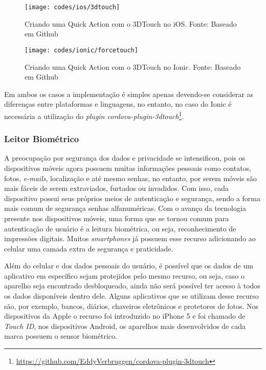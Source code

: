 \begin{figure}[H]
	\centering
	\texttt{[image: codes/ios/3dtouch]}
	\caption[Criando uma Quick Action com o 3DTouch no iOS.]{Criando uma Quick Action com o 3DTouch no iOS. Fonte: Baseado em Github\protect\footnotemark}
	\label{fig:3dtouch-ios}
\end{figure}
\begin{figure}[H]
	\centering
	\texttt{[image: codes/ionic/forcetouch]}
	\caption[Criando uma Quick Action com o 3DTouch no Ionic]{Criando uma Quick Action com o 3DTouch no Ionic. Fonte: Baseado em Github\protect\footnotemark}
	\label{fig:forcetouch-ionic}
\end{figure}

Em ambos os casos a implementação é simples apenas devendo-se considerar as diferenças entre plataformas e linguagens, no entanto, no caso do Ionic é necessária a utilização do 
\textit{plugin cordova-plugin-3dtouch}\footnote{\url{https://github.com/EddyVerbruggen/cordova-plugin-3dtouch}}. 

\subsubsection{Leitor Biométrico} \label{subsubsec:biometrico}
A preocupação por segurança dos dados e privacidade se intensificou, pois os dispositivos móveis agora possuem muitas informações pessoais como contatos, fotos, \textit{e-mails}, localização e até mesmo senhas, no entanto,
por serem móveis são mais fáceis de serem extraviados, furtados ou invadidos. Com isso, cada dispositivo possui seus próprios meios de autenticação e segurança, sendo a forma mais comum de segurança senhas alfanuméricas. 
Com o avanço da tecnologia presente nos dispositivos móveis, uma forma que se tornou comum para autenticação de usuário é a leitura biométrica, ou seja, reconhecimento de impressões digitais. Muitos \textit{smartphones} 
já possuem esse recurso adicionando ao celular uma camada extra de segurança e praticidade. 

Além do celular e dos dados pessoais do usuário, é possível que os dados de um aplicativo em específico sejam protejidos pelo mesmo recurso, ou seja, caso o aparelho seja encontrado desbloqueado, ainda não será possível 
ter acesso à todos os dados disponíveis dentro dele. Alguns aplicativos que se utilizam desse recurso são, por exemplo, bancos, diários, chaveiros eletrônicos e protetores de fotos. Nos dispositivos da Apple o recurso 
foi introduzido no iPhone 5 e foi chamado de \textit{Touch ID}, nos dispositivos Android, os aparelhos mais desenvolvidos de cada marca possuem o sensor biométrico. 

